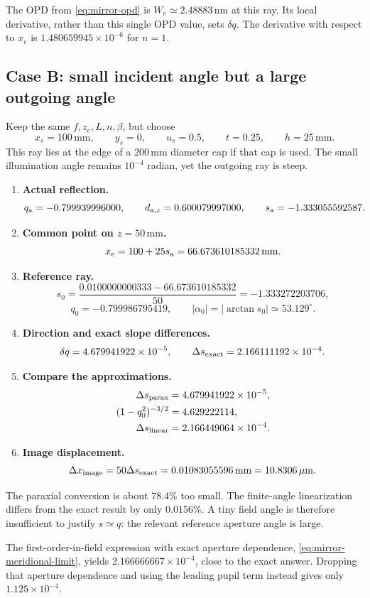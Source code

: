 \documentclass[11pt,a4paper]{article}
\numberwithin{equation}{section}
\newcommand{\mm}{\,\mathrm{mm}}
\newcommand{\nm}{\,\mathrm{nm}}
\newcommand{\um}{\,\mu\mathrm{m}}
\begin{document}
The OPD from \eqref{eq:mirror-opd} is $W_e\simeq2.48883\nm$
at this ray. Its local derivative, rather than this single OPD value,
sets $\delta q$. The derivative with respect to $x_e$ is
$1.480659945\times10^{-6}$ for $n=1$.

\subsection{Case B: small incident angle but a large outgoing angle}
Keep the same $f,z_e,L,n,\beta$, but choose
\[
 x_s=100\mm,\qquad y_s=0,\qquad
 u_s=0.5,\qquad t=0.25,\qquad h=25\mm.
\]
This ray lies at the edge of a $200\mm$ diameter cap if that cap is used.
The small illumination angle remains $10^{-4}$ radian, yet the outgoing
ray is steep.
\begin{enumerate}
 \item \textbf{Actual reflection.}
 \[
 q_{\rm a}=-0.799939996000,\qquad
 d_{{\rm a},z}=0.600079997000,\qquad
 s_{\rm a}=-1.333055592587.
 \]
 \item \textbf{Common point on $z=50\mm$.}
 \[
 x_e=100+25s_{\rm a}=66.673610185332\mm.
 \]
 \item \textbf{Reference ray.}
 \[
 s_0=\frac{0.0100000000333-66.673610185332}{50}
    =-1.333272203706,
 \]
 \[
 q_0=-0.799986795419,\qquad
 |\alpha_0|=|\arctan s_0|\simeq53.129^\circ.
 \]
 \item \textbf{Direction and exact slope differences.}
 \[
 \delta q=4.679941922\times10^{-5},\qquad
 \Delta s_{\rm exact}=2.166111192\times10^{-4}.
 \]
 \item \textbf{Compare the approximations.}
 \begin{align*}
 \Delta s_{\rm parax}&=4.679941922\times10^{-5},\\
 (1-q_0^2)^{-3/2}&=4.629222114,\\
 \Delta s_{\rm linear}&=2.166449064\times10^{-4}.
 \end{align*}
 \item \textbf{Image displacement.}
 \[
 \Delta x_{\rm image}=50\Delta s_{\rm exact}
 =0.01083055596\mm=10.8306\um.
 \]
\end{enumerate}
The paraxial conversion is about $78.4\%$ too small.
The finite-angle linearization differs from the exact result by only
$0.0156\%$. A tiny field angle is therefore insufficient to justify
$s\simeq q$: the relevant reference aperture angle is large.

The first-order-in-field expression with exact aperture dependence,
\eqref{eq:mirror-meridional-limit}, yields
$2.166666667\times10^{-4}$, close to the exact answer.
Dropping that aperture dependence and using the leading pupil term
instead gives only $1.125\times10^{-4}$.
\end{document}
